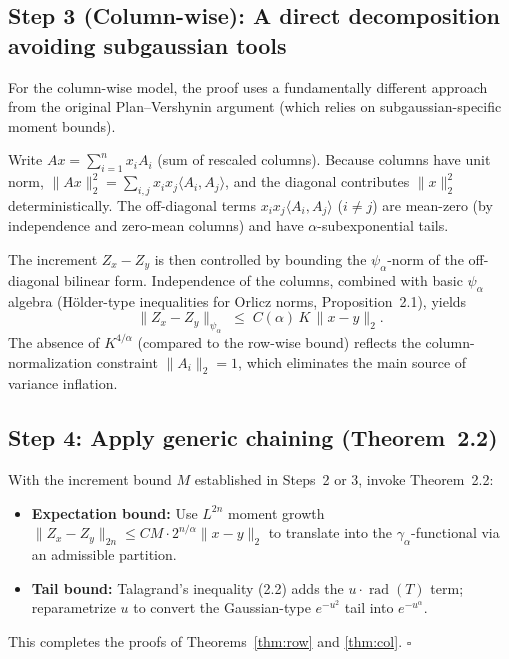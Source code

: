 \documentclass[11pt,a4paper]{article}
\begin{document}
\subsection*{Step 3 (Column-wise): A direct decomposition avoiding subgaussian tools}

For the column-wise model, the proof uses a fundamentally different approach from the original Plan--Vershynin argument (which relies on subgaussian-specific moment bounds).

Write $Ax = \sum_{i=1}^n x_i A_i$ (sum of rescaled columns). Because columns have unit norm, $\|Ax\|_2^2 = \sum_{i,j}x_i x_j\langle A_i, A_j\rangle$, and the diagonal contributes $\|x\|_2^2$ deterministically. The off-diagonal terms $x_i x_j\langle A_i,A_j\rangle$ ($i\ne j$) are mean-zero (by independence and zero-mean columns) and have $\alpha$-subexponential tails.

The increment $Z_x - Z_y$ is then controlled by bounding the $\psi_\alpha$-norm of the off-diagonal bilinear form. Independence of the columns, combined with basic $\psi_\alpha$ algebra (H\"older-type inequalities for Orlicz norms, Proposition~2.1), yields
\[
  \|Z_x - Z_y\|_{\psi_\alpha} \;\le\; C(\alpha)\,K\,\|x-y\|_2.
\]
The absence of $K^{4/\alpha}$ (compared to the row-wise bound) reflects the column-normalization constraint $\|A_i\|_2=1$, which eliminates the main source of variance inflation.

\subsection*{Step 4: Apply generic chaining (Theorem~2.2)}

With the increment bound $M$ established in Steps~2 or 3, invoke Theorem~2.2:
\begin{itemize}[leftmargin=*]
  \item \textbf{Expectation bound:} Use $L^{2n}$ moment growth $\|Z_x-Z_y\|_{2n}\le CM\cdot 2^{n/\alpha}\|x-y\|_2$ to translate into the $\gamma_\alpha$-functional via an admissible partition.
  \item \textbf{Tail bound:} Talagrand's inequality (2.2) adds the $u\cdot\operatorname{rad}(T)$ term; reparametrize $u$ to convert the Gaussian-type $e^{-u^2}$ tail into $e^{-u^\alpha}$.
\end{itemize}

This completes the proofs of Theorems~\ref{thm:row} and \ref{thm:col}. $\square$

\end{document}
